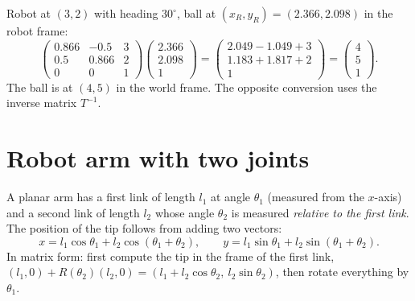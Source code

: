 \begin{example}
Robot at $(3,2)$ with heading $30^\circ$, ball at $(x_R,y_R)=(2.366,2.098)$ in the robot frame:
\[
\begin{pmatrix}0.866&-0.5&3\\0.5&0.866&2\\0&0&1\end{pmatrix}\begin{pmatrix}2.366\\2.098\\1\end{pmatrix}
=\begin{pmatrix}2.049-1.049+3\\1.183+1.817+2\\1\end{pmatrix}=\begin{pmatrix}4\\5\\1\end{pmatrix}.
\]
The ball is at $(4,5)$ in the world frame. The opposite conversion uses the inverse matrix $T^{-1}$.
\end{example}

\section*{Robot arm with two joints}
A planar arm has a first link of length $l_1$ at angle $\theta_1$ (measured from the $x$-axis) and a second link of length $l_2$ whose angle $\theta_2$ is measured \emph{relative to the first link}. The position of the tip follows from adding two vectors:
\[
x=l_1\cos\theta_1+l_2\cos(\theta_1+\theta_2),\qquad
y=l_1\sin\theta_1+l_2\sin(\theta_1+\theta_2).
\]
In matrix form: first compute the tip in the frame of the first link, $\left(l_1,0\right)+R(\theta_2)\left(l_2,0\right)=(l_1+l_2\cos\theta_2,\ l_2\sin\theta_2)$, then rotate everything by $\theta_1$.

\begin{center}

\label{fig:b3_11}
\end{center}

